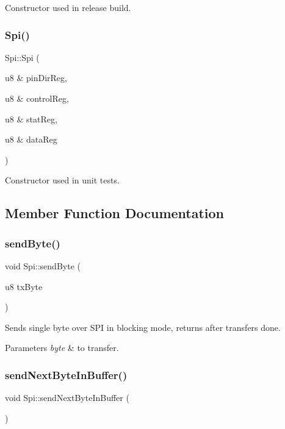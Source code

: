 Constructor used in release build. \mbox{\label{class_spi_aa5bff4855080ca494dda262669931973}} 
\subsubsection{\texorpdfstring{Spi()}{Spi()}\hspace{0.1cm}{\footnotesize\ttfamily [2/2]}}
{\footnotesize\ttfamily Spi\+::\+Spi (\begin{DoxyParamCaption}\item[{u8 \&}]{pin\+Dir\+Reg,  }\item[{u8 \&}]{control\+Reg,  }\item[{u8 \&}]{stat\+Reg,  }\item[{u8 \&}]{data\+Reg }\end{DoxyParamCaption})}

Constructor used in unit tests. 

\subsection{Member Function Documentation}
\mbox{\label{class_spi_af95597dbf2ad61755808ea6d87e587f1}} 
\subsubsection{\texorpdfstring{send\+Byte()}{sendByte()}}
{\footnotesize\ttfamily void Spi\+::send\+Byte (\begin{DoxyParamCaption}\item[{u8}]{tx\+Byte }\end{DoxyParamCaption})}

Sends single byte over S\+PI in blocking mode, returns after transfer\textquotesingle{}s done. 
\begin{DoxyParams}{Parameters}
{\em byte} & to transfer. \\
\hline
\end{DoxyParams}
\mbox{\label{class_spi_ad356e46ffdf7cc7d674eb871f05e8b0d}} 
\subsubsection{\texorpdfstring{send\+Next\+Byte\+In\+Buffer()}{sendNextByteInBuffer()}}
{\footnotesize\ttfamily void Spi\+::send\+Next\+Byte\+In\+Buffer (\begin{DoxyParamCaption}{ }\end{DoxyParamCaption})}

